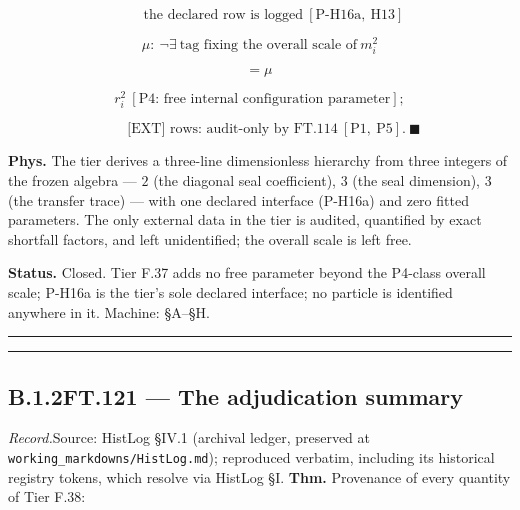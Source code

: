 \documentclass[11pt,openany]{report}
\theoremstyle{canonplain}
\theoremstyle{canondef}
\begin{document}
\[
\qquad \text{the declared row is logged}\ [\text{P-H16a},\ \mathrm{H13}]
\]

\[
\mu:\ \neg\exists\ \text{tag fixing the overall scale of}\ m_i^2
\]

\[
= \mu\,
\]

\[
r_i^2\ [\text{P4: free internal configuration parameter}];
\]

\[
\qquad \text{[EXT] rows: audit-only by FT.114}\ [\text{P1},\ \text{P5}].\ \blacksquare
\]

\textbf{Phys.} The tier derives a three-line dimensionless hierarchy from three integers of the frozen algebra — $2$ (the diagonal seal coefficient), $3$ (the seal dimension), $3$ (the transfer trace) — with one declared interface (P-H16a) and zero fitted parameters. The only external data in the tier is audited, quantified by exact shortfall factors, and left unidentified; the overall scale is left free.

\textbf{Status.} Closed. Tier F.37 adds no free parameter beyond the P4-class overall scale; P-H16a is the tier's sole declared interface; no particle is identified anywhere in it. Machine: §A–§H.

\vspace{2pt}\noindent\rule{\textwidth}{0.4pt}\vspace{2pt}

\vspace{2pt}\noindent\rule{\textwidth}{0.4pt}\vspace{2pt}

\medskip
\subsection*{\texorpdfstring{B.1.2\quad FT.121 — The adjudication summary}{FT.121 B.1.2}}
\label{tag:FT-121}
{\small \textit{Record.}\quad Source: HistLog §IV.1 (archival ledger, preserved at \texttt{working\_markdowns/HistLog.md}); reproduced verbatim, including its historical registry tokens, which resolve via HistLog \S I.}
\medskip
\textbf{Thm.} Provenance of every quantity of Tier F.38:
\end{document}
